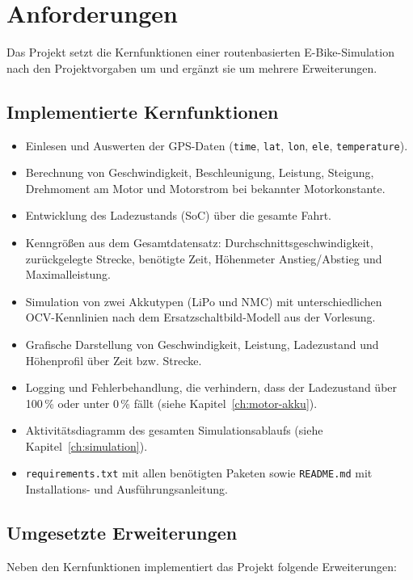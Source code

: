 \chapter{Anforderungen}
\label{ch:anforderungen}

Das Projekt setzt die Kernfunktionen einer routenbasierten E-Bike-Simulation nach den Projektvorgaben um und ergänzt sie um mehrere Erweiterungen.

\section{Implementierte Kernfunktionen}

\begin{itemize}
  \item Einlesen und Auswerten der GPS-Daten (\texttt{time}, \texttt{lat}, \texttt{lon}, \texttt{ele}, \texttt{temperature}).
  \item Berechnung von Geschwindigkeit, Beschleunigung, Leistung, Steigung, Drehmoment am Motor und Motorstrom bei bekannter Motorkonstante.
  \item Entwicklung des Ladezustands (SoC) über die gesamte Fahrt.
  \item Kenngrößen aus dem Gesamtdatensatz: Durchschnittsgeschwindigkeit, zurückgelegte Strecke, benötigte Zeit, Höhenmeter Anstieg/Abstieg und Maximalleistung.
  \item Simulation von zwei Akkutypen (LiPo und NMC) mit unterschiedlichen OCV-Kennlinien nach dem Ersatzschaltbild-Modell aus der Vorlesung.
  \item Grafische Darstellung von Geschwindigkeit, Leistung, Ladezustand und Höhenprofil über Zeit bzw. Strecke.
  \item Logging und Fehlerbehandlung, die verhindern, dass der Ladezustand über 100\,\% oder unter 0\,\% fällt (siehe Kapitel~\ref{ch:motor-akku}).
  \item Aktivitätsdiagramm des gesamten Simulationsablaufs (siehe Kapitel~\ref{ch:simulation}).
  \item \texttt{requirements.txt} mit allen benötigten Paketen sowie \texttt{README.md} mit Installations- und Ausführungsanleitung.
\end{itemize}

\section{Umgesetzte Erweiterungen}

Neben den Kernfunktionen implementiert das Projekt folgende Erweiterungen:

